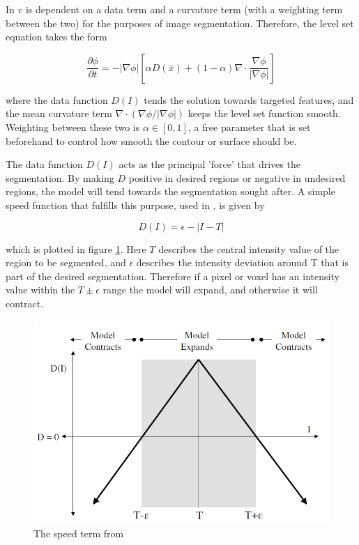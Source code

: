 \documentclass{report}
\begin{document}
In \cite{Lefohn04astreaming} $v$ is dependent on a data term and a curvature term (with a weighting term between the two) for the purposes of image segmentation. Therefore, the level set equation takes the form

\begin{equation}
\frac{\partial{\phi}}{\partial{t}}=-|\nabla{\phi}|\left[\alpha D(\bar{x})  + (1-\alpha)\nabla \cdot{\frac{\nabla{\phi}}{|\nabla{\phi|}}}\right]
\end{equation}

where the data function $D(I)$ tends the solution towards targeted features, and the mean curvature term $\nabla \cdot{(\nabla{\phi}/|\nabla{\phi|})}$ keeps the level set function smooth. Weighting between these two is $\alpha \in [0,1]$, a free parameter that is set beforehand to control how smooth the contour or surface should be.

The data function $D(I)$ acts as the principal 'force' that drives the segmentation. By making $D$ positive in desired regions or negative in undesired regions, the model will tend towards the segmentation sought after. A simple speed function that fulfills this purpose, used in \cite{gist}, is given by

\begin{equation}
D(I)= \epsilon - |I-T|
\end{equation}

which is plotted in figure \ref{fig:speedterm}. Here $T$ describes the central intensity value of the region to be segmented, and $\epsilon$ describes the intensity deviation around T that is part of the desired segmentation. Therefore if a pixel or voxel has an intensity value within the $T\pm\epsilon$ range the model will expand, and otherwise it will contract. 

\begin{figure}[h]
	\centering
		\includegraphics[scale=0.35]{images/speedterm.png}
	\caption{The speed term from \cite{gist}}
	\label{fig:speedterm}
\end{figure}
\end{document}
